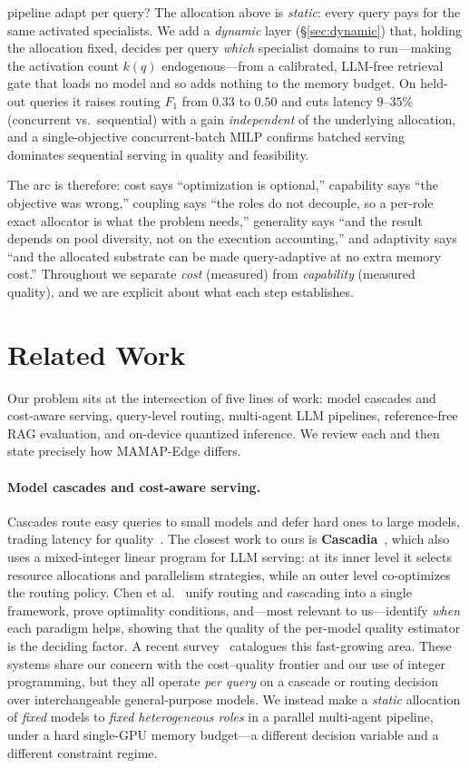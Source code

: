 \documentclass[11pt]{article}
\begin{document}
\begin{description}
{pipeline adapt per query?} The allocation above is \emph{static}: every query pays
for the same activated specialists. We add a \emph{dynamic} layer
(§\ref{sec:dynamic}) that, holding the allocation fixed, decides per query
\emph{which} specialist domains to run---making the activation count $k(q)$
endogenous---from a calibrated, LLM-free retrieval gate that loads no model and so
adds nothing to the memory budget. On held-out queries it raises routing $F_1$ from
$0.33$ to $0.50$ and cuts latency $9$--$35\%$ (concurrent vs.\ sequential) with a
gain \emph{independent} of the underlying allocation, and a single-objective
concurrent-batch MILP confirms batched serving dominates sequential serving in
quality and feasibility.
\end{description}
The arc is therefore: cost says ``optimization is optional,'' capability says ``the
objective was wrong,'' coupling says ``the roles do not decouple, so a
per-role exact allocator is what the problem needs,'' generality says ``and the
result depends on pool diversity, not on the execution accounting,'' and adaptivity
says ``and the allocated substrate can be made query-adaptive at no extra memory
cost.'' Throughout we separate
\emph{cost} (measured) from \emph{capability} (measured quality), and we are
explicit about what each step establishes.

\section{Related Work}
\label{sec:related}
Our problem sits at the intersection of five lines of work: model cascades and
cost-aware serving, query-level routing, multi-agent LLM pipelines, reference-free
RAG evaluation, and on-device quantized inference. We review each and then state
precisely how MAMAP-Edge differs.

\paragraph{Model cascades and cost-aware serving.}
Cascades route easy queries to small models and defer hard ones to large models,
trading latency for quality~\cite{cascadetrain,semanticcascade}. The closest work
to ours is \textbf{Cascadia}~\cite{cascadia}, which also uses a mixed-integer
linear program for LLM serving: at its inner level it selects resource allocations
and parallelism strategies, while an outer level co-optimizes the routing policy.
Chen et al.~\cite{cascaderouting} unify routing and cascading into a single
framework, prove optimality conditions, and---most relevant to us---identify
\emph{when} each paradigm helps, showing that the quality of the per-model quality
estimator is the deciding factor. A recent survey~\cite{routingsurvey} catalogues
this fast-growing area. These systems share our concern with the cost--quality
frontier and our use of integer programming, but they all operate \emph{per query}
on a cascade or routing decision over interchangeable general-purpose models. We
instead make a \emph{static} allocation of \emph{fixed} models to \emph{fixed
heterogeneous roles} in a parallel multi-agent pipeline, under a hard single-GPU
memory budget---a different decision variable and a different constraint regime.
\end{document}

